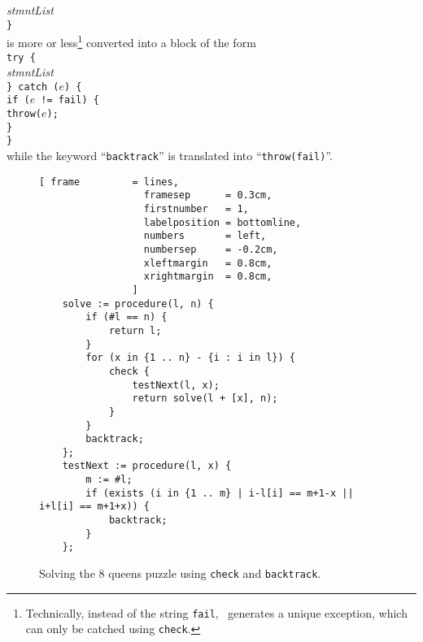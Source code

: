 \hspace*{1.8cm}
\textsl{stmntList}
\\
\hspace*{1.3cm}
\texttt{\}}
\\[0.2cm]
is more or less\footnote{
Technically, instead of the string \texttt{fail}, \setlx\ 
generates a unique exception, which can only be catched using \texttt{check}. 
}
converted into a block of the form
\\[0.2cm]
\hspace*{1.3cm}
\texttt{try \{} 
\\
\hspace*{1.8cm}
\textsl{stmntList}
\\
\hspace*{1.3cm}
\texttt{\} catch ($e$) \{}
\\
\hspace*{1.8cm}
\texttt{if ($e$ != fail) \{}
\\
\hspace*{2.3cm}
\texttt{throw($e$);}
\\
\hspace*{1.8cm}
\texttt{\}}
\\
\hspace*{1.3cm}
\texttt{\}}
\\[0.2cm]
while the keyword ``\texttt{backtrack}'' is translated into
``\texttt{throw(fail\symbol{34})}''.   


\begin{figure}[!ht]
\centering
\begin{Verbatim}[ frame         = lines, 
                  framesep      = 0.3cm, 
                  firstnumber   = 1,
                  labelposition = bottomline,
                  numbers       = left,
                  numbersep     = -0.2cm,
                  xleftmargin   = 0.8cm,
                  xrightmargin  = 0.8cm,
                ]
    solve := procedure(l, n) { 
        if (#l == n) {
            return l;
        }
        for (x in {1 .. n} - {i : i in l}) {
            check {
                testNext(l, x);
                return solve(l + [x], n);
            } 
        }
        backtrack;
    };
    testNext := procedure(l, x) {
        m := #l;
        if (exists (i in {1 .. m} | i-l[i] == m+1-x || i+l[i] == m+1+x)) {
            backtrack;
        }
    };
\end{Verbatim}
\vspace*{-0.3cm}
\caption{Solving the 8 queens puzzle using \texttt{check} and \texttt{backtrack}.}
\label{fig:queens-nice.stlx}
\end{figure}

